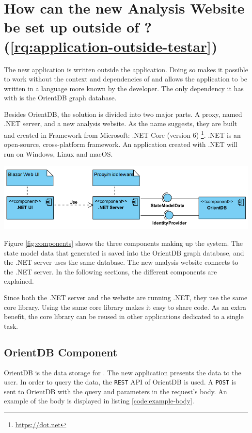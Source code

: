\section{How can the new Analysis Website be set up outside of \testar? (\ref{rq:application-outside-testar})} \label{sec:components-explained}
The new application is written outside the \testar application. Doing so makes it possible to work without the context and dependencies of \testar and allows the application to be written in a language more known by the developer. The only dependency it has with \testar is the OrientDB graph database.

Besides OrientDB, the solution is divided into two major parts. A \testar proxy, named .NET server, and a new \testar analysis website. As the name suggests, they are built and created in Framework from Microsoft: .NET Core (version 6) \footnote{\url{https://dot.net}}. .NET is an open-source, cross-platform framework. An application created with .NET will run on Windows, Linux and macOS. 

\begingroup
\captionsetup{type=figure}
\includegraphics[scale=0.7]{images/server-ui-comp.png}
\label{fig:components}
\endgroup

Figure \ref{fig:components} shows the three components making up the system. The state model data that \testar generated is saved into the OrientDB graph database, and the .NET server uses the same database. The new \testar analysis website connects to the .NET server. In the following sections, the different components are explained. 

Since both the .NET server and the website are running .NET, they use the same core library. Using the same core library makes it easy to share code. As an extra benefit, the core library can be reused in other applications dedicated to a single task. 

\subsection{OrientDB Component}
OrientDB is the data storage for \testar. The new application presents the data to the user. In order to query the data, the \verb|REST| API of OrientDB is used. A \verb|POST| is sent to OrientDB with the query and parameters in the request's body. An example of the body is displayed in listing \ref{code:example-body}.

